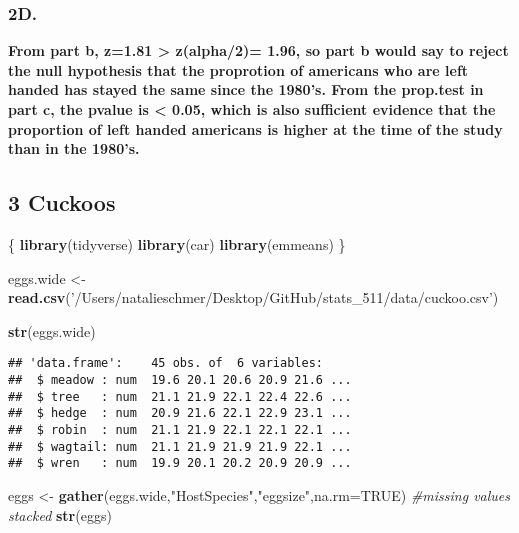 \documentclass[]{article}
\newenvironment{Shaded}{\begin{snugshade}}{\end{snugshade}}
\newcommand{\CommentTok}[1]{\textcolor[rgb]{0.56,0.35,0.01}{\textit{#1}}}
\newcommand{\DataTypeTok}[1]{\textcolor[rgb]{0.13,0.29,0.53}{#1}}
\newcommand{\KeywordTok}[1]{\textcolor[rgb]{0.13,0.29,0.53}{\textbf{#1}}}
\newcommand{\NormalTok}[1]{#1}
\newcommand{\OtherTok}[1]{\textcolor[rgb]{0.56,0.35,0.01}{#1}}
\newcommand{\StringTok}[1]{\textcolor[rgb]{0.31,0.60,0.02}{#1}}
\begin{document}
\hypertarget{d.}{%
\subsubsection{2D.}\label{d.}}

\textbf{From part b, z=1.81 \textgreater{} z(alpha/2)= 1.96, so part b
would say to reject the null hypothesis that the proprotion of americans
who are left handed has stayed the same since the 1980's. From the
prop.test in part c, the pvalue is \textless{} 0.05, which is also
sufficient evidence that the proportion of left handed americans is
higher at the time of the study than in the 1980's.}

\hypertarget{cuckoos}{%
\subsection{3 Cuckoos}\label{cuckoos}}

\begin{Shaded}
\begin{Highlighting}[]
\NormalTok{\{ }
  \KeywordTok{library}\NormalTok{(tidyverse)}
  \KeywordTok{library}\NormalTok{(car)}
  \KeywordTok{library}\NormalTok{(emmeans)}
\NormalTok{\}}

\NormalTok{eggs.wide <-}\StringTok{ }\KeywordTok{read.csv}\NormalTok{(}\StringTok{'/Users/natalieschmer/Desktop/GitHub/stats_511/data/cuckoo.csv'}\NormalTok{)}

\KeywordTok{str}\NormalTok{(eggs.wide)}
\end{Highlighting}
\end{Shaded}

\begin{verbatim}
## 'data.frame':    45 obs. of  6 variables:
##  $ meadow : num  19.6 20.1 20.6 20.9 21.6 ...
##  $ tree   : num  21.1 21.9 22.1 22.4 22.6 ...
##  $ hedge  : num  20.9 21.6 22.1 22.9 23.1 ...
##  $ robin  : num  21.1 21.9 22.1 22.1 22.1 ...
##  $ wagtail: num  21.1 21.9 21.9 21.9 22.1 ...
##  $ wren   : num  19.9 20.1 20.2 20.9 20.9 ...
\end{verbatim}

\begin{Shaded}
\begin{Highlighting}[]
\NormalTok{eggs <-}\StringTok{ }\KeywordTok{gather}\NormalTok{(eggs.wide,}\StringTok{"HostSpecies"}\NormalTok{,}\StringTok{"eggsize"}\NormalTok{,}\DataTypeTok{na.rm=}\OtherTok{TRUE}\NormalTok{) }\CommentTok{#missing values stacked}
\KeywordTok{str}\NormalTok{(eggs)}
\end{Highlighting}
\end{Shaded}
\end{document}
